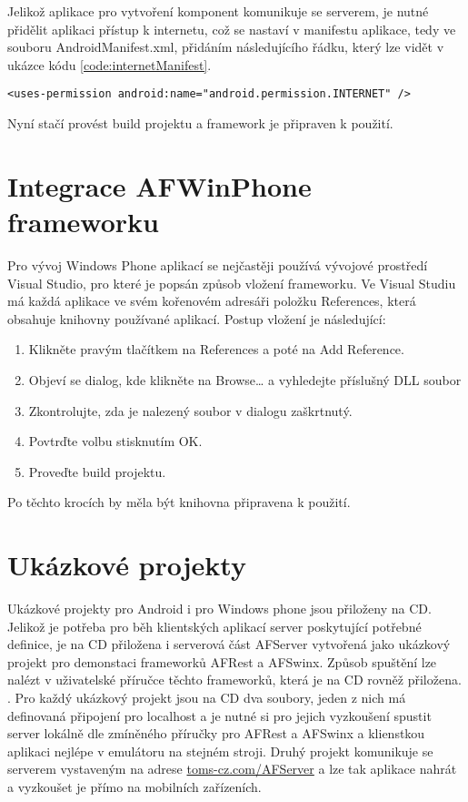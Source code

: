 Jelikož aplikace pro vytvoření komponent komunikuje se serverem, je nutné přidělit aplikaci přístup k internetu, což se nastaví v manifestu aplikace, tedy ve souboru AndroidManifest.xml, přidáním následujícího řádku, který lze vidět v ukázce kódu \ref{code:internetManifest}.
\begin{lstlisting}[caption={Android manifest - udělení přístupu k internetu},
label={code:internetManifest}, basicstyle=\footnotesize, frame=single]
<uses-permission android:name="android.permission.INTERNET" /> 
\end{lstlisting}

Nyní stačí provést build projektu a framework je připraven k použití.

\section{Integrace AFWinPhone frameworku}
Pro vývoj Windows Phone aplikací se nejčastěji používá vývojové prostředí Visual Studio, pro které je popsán způsob vložení frameworku. Ve Visual Studiu má každá aplikace ve svém kořenovém adresáři položku References, která obsahuje knihovny používané aplikací. Postup vložení je následující:
\begin{enumerate}
\item Klikněte pravým tlačítkem na References a poté na Add Reference.
\item Objeví se dialog, kde klikněte na Browse… a vyhledejte příslušný DLL soubor
\item Zkontrolujte, zda je nalezený soubor v dialogu zaškrtnutý.
\item Povtrďte volbu stisknutím OK.
\item Proveďte build projektu. 
\end{enumerate}
Po těchto krocích by měla být knihovna připravena k použití.

\section{Ukázkové projekty}
Ukázkové projekty pro Android i pro Windows phone jsou přiloženy na CD. Jelikož je potřeba pro běh klientských aplikací server poskytující potřebné definice, je na CD přiložena i serverová část AFServer vytvořená jako ukázkový projekt pro demonstaci frameworků AFRest a AFSwinx. Způsob spuštění lze nalézt v uživatelské příručce těchto frameworků, která je na CD rovněž přiložena. \cite{tomasek-thesis}. Pro každý ukázkový projekt jsou na CD dva soubory, jeden z nich má definovaná připojení pro localhost a je nutné si pro jejich vyzkoušení spustit server lokálně dle zmíněného příručky pro AFRest a AFSwinx a klienstkou aplikaci nejlépe v emulátoru na stejném stroji. Druhý projekt komunikuje se serverem vystaveným na adrese \url{toms-cz.com/AFServer} a lze tak aplikace nahrát a vyzkoušet je přímo na mobilních zařízeních. 
